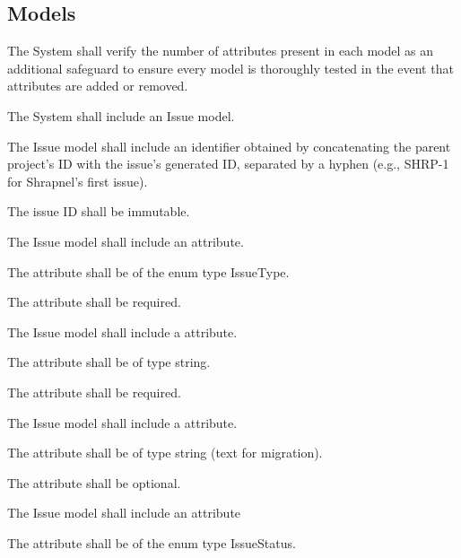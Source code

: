 \documentclass[12pt]{report}
\begin{document}
	\subsection{Models}
		\begin{reqlist}
			\item The System shall verify the number of attributes present in each model as an additional safeguard to ensure every model is thoroughly tested in the event that attributes are added or removed.
			\item The System shall include an Issue model.
			\begin{reqlist}
				\item The Issue model shall include an identifier obtained by concatenating the parent project's ID with the issue's generated ID, separated by a hyphen (e.g., SHRP-1 for Shrapnel's first issue).
				\begin{reqlist}
					\item The issue ID shall be immutable.
				\end{reqlist}
				\item The Issue model shall include an  attribute. \label{item:test}
				\begin{reqlist}
					\item The attribute shall be of the enum type IssueType.
					\item The attribute shall be required.
				\end{reqlist}
				\item The Issue model shall include a  attribute.
				\begin{reqlist}
					\item The attribute shall be of type string.
					\item The attribute shall be required.
				\end{reqlist}
				\item The Issue model shall include a  attribute.
				\begin{reqlist}
					\item The attribute shall be of type string (text for migration).
					\item The attribute shall be optional.
				\end{reqlist}
				\item The Issue model shall include an  attribute
				\begin{reqlist}
					\item The attribute shall be of the enum type IssueStatus.

\end{reqlist}
\end{reqlist}
\end{reqlist}
\end{document}
